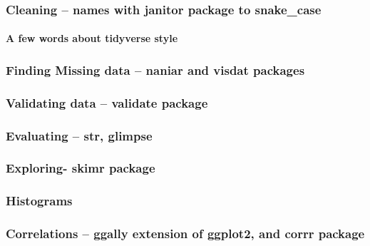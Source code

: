 \documentclass[]{book}
\let\oldparagraph\paragraph
\renewcommand{\paragraph}[1]{\oldparagraph{#1}\mbox{}}
\theoremstyle{definition}
\theoremstyle{definition}
\theoremstyle{definition}
\theoremstyle{remark}
\begin{document}
\hypertarget{cleaning-names-with-janitor-package-to-snake_case}{%
\subsubsection{Cleaning -- names with janitor package to
snake\_case}\label{cleaning-names-with-janitor-package-to-snake_case}}

\hypertarget{a-few-words-about-tidyverse-style}{%
\paragraph{A few words about tidyverse
style}\label{a-few-words-about-tidyverse-style}}

\hypertarget{finding-missing-data-naniar-and-visdat-packages}{%
\subsubsection{Finding Missing data -- naniar and visdat
packages}\label{finding-missing-data-naniar-and-visdat-packages}}

\hypertarget{validating-data-validate-package}{%
\subsubsection{Validating data -- validate
package}\label{validating-data-validate-package}}

\hypertarget{evaluating-str-glimpse}{%
\subsubsection{Evaluating -- str,
glimpse}\label{evaluating-str-glimpse}}

\hypertarget{exploring--skimr-package}{%
\subsubsection{Exploring- skimr
package}\label{exploring--skimr-package}}

\hypertarget{histograms}{%
\subsubsection{Histograms}\label{histograms}}

\hypertarget{correlations-ggally-extension-of-ggplot2-and-corrr-package}{%
\subsubsection{Correlations -- ggally extension of ggplot2, and corrr
package}\label{correlations-ggally-extension-of-ggplot2-and-corrr-package}}
\end{document}
